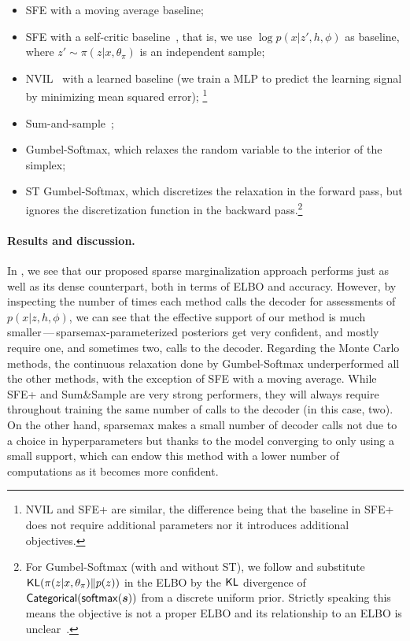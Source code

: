 \begin{itemize}
    \item SFE with a moving average baseline;
    \item SFE with a self-critic
          baseline~\citep[SFE+;][]{rennie2017self}, that is, we use $\log
              p(x|z', h, \phi)$ as baseline, where $z' \sim \pi(z|x, \theta_\pi)$
          is an independent sample;
    \item NVIL~\citep{mnih2014neural}
          with a learned baseline (we train a MLP to predict the learning
          signal by minimizing mean squared error);
          \footnote{NVIL and SFE+ are
              similar, the difference being that the baseline in SFE+ does not
              require additional parameters nor it introduces additional
              objectives.}
    \item Sum-and-sample~\citep{RB19};
    \item Gumbel-Softmax, which relaxes the random variable to the interior of the simplex;
    \item ST Gumbel-Softmax, which discretizes the relaxation in
          the forward pass, but ignores the discretization function in the
          backward pass.\footnote{For Gumbel-Softmax (with and
              without ST), we follow \citet{GumbelSoftmax} and substitute
              $\operatorname{\mathsf{KL}}(\pi(z|x, \theta_\pi) \| p(z))$ in the ELBO by the $\operatorname{\mathsf{KL}}$
              divergence of $\operatorname{\mathsf{Categorical}}(\operatorname*{\mathsf{softmax}}(\bm{s}))$ from a discrete uniform prior.
              Strictly speaking this means the objective is not a proper ELBO and
              its relationship to an ELBO is unclear~\citep[Appendix
                  C.2]{Concrete}.}
\end{itemize}

\paragraph*{Results and discussion.}

In , we see that our proposed sparse
marginalization approach performs just as well as its dense
counterpart, both in terms of ELBO and accuracy. However, by
inspecting the number of times each method calls the decoder for
assessments of $p(x|z, h,\phi)$, we can see that the effective
support of our method is much smaller\,---\,sparsemax-parameterized
posteriors get very confident, and mostly require one, and sometimes
two, calls to the decoder. Regarding the Monte Carlo methods, the
continuous relaxation done by Gumbel-Softmax underperformed all the
other methods, with the exception of SFE with a moving average. While
SFE+ and Sum\&Sample are very strong performers, they will always
require throughout training the same number of calls to the decoder
(in this case, two). On the other hand, sparsemax makes a small
number of decoder calls not due to a choice in hyperparameters but
thanks to the model converging to only using a small support, which
can endow this method with a lower number of computations as it
becomes more confident.

